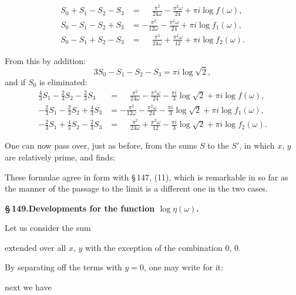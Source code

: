 
\[
\begin{aligned}
S_0+S_1-S_2-S_3&=\phantom{-}\frac{\pi^2}{24\omega}-\frac{\pi^2\omega}{24}+\pi i\log f(\omega),\\[4pt]
S_0-S_1-S_2+S_3&=-\frac{\pi^2}{12\omega}-\frac{\pi^2\omega}{24}+\pi i\log f_1(\omega),\\[4pt]
S_0-S_1+S_2-S_3&=\phantom{-}\frac{\pi^2}{24\omega}+\frac{\pi^2\omega}{12}+\pi i\log f_2(\omega).
\end{aligned}
\]

From this by addition:
\[
3S_0-S_1-S_2-S_3=\pi i\log\sqrt{2},
\]
and if $S_0$ is eliminated:
\[
\begin{aligned}
\tfrac{4}{3}S_1-\tfrac{2}{3}S_2-\tfrac{2}{3}S_3&=\phantom{-}\frac{\pi^2}{24\omega}-\frac{\pi^2\omega}{24}-\frac{\pi i}{3}\log\sqrt{2}+\pi i\log f(\omega),\\[4pt]
-\tfrac{2}{3}S_1-\tfrac{2}{3}S_2+\tfrac{4}{3}S_3&=-\frac{\pi^2}{12\omega}-\frac{\pi^2\omega}{24}-\frac{\pi i}{3}\log\sqrt{2}+\pi i\log f_1(\omega),\\[4pt]
-\tfrac{2}{3}S_1+\tfrac{4}{3}S_2-\tfrac{2}{3}S_3&=\phantom{-}\frac{\pi^2}{24\omega}+\frac{\pi^2\omega}{12}-\frac{\pi i}{3}\log\sqrt{2}+\pi i\log f_2(\omega).
\end{aligned}
\]

One can now pass over, just as before, from the sums $S$ to
the $S'$, in which $x$, $y$ are relatively prime, and finds:


These formulae agree in form with \S\,147, (11), which is
remarkable in so far as the manner of the passage to the limit
is a different one in the two cases.

\begin{center}
\textbf{\S\,149.\quad Developments for the function $\log\eta(\omega)$.}
\end{center}

Let us consider the sum


extended over all $x$, $y$ with the exception of the combination $0$, $0$.

By separating off the terms with $y=0$, one may write for
it:


next we have
